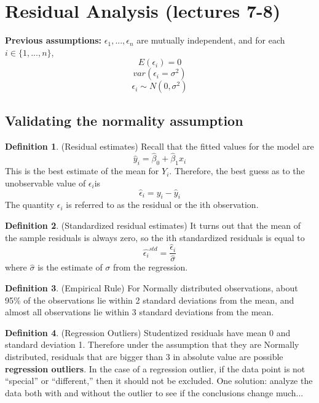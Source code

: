 \documentclass[12pt]{article}
\theoremstyle{definition}
\newtheorem{definition}{Definition}[section]
\theoremstyle{remark}
\begin{document}
\section{Residual Analysis (lectures 7-8)}
\textbf{Previous assumptions:}
\newline $\epsilon_1, ..., \epsilon_n$ are mutually independent, and for each $i \in \{1,..., n\}$, 
$$E(\epsilon_i) = 0$$
$$var(\epsilon_i = \sigma^2)$$
$$\epsilon_i \sim N(0, \sigma^2)$$
\subsection{Validating the normality assumption}
\begin{definition}(Residual estimates)
    Recall that the fitted values for the model are
    $$\hat{y}_i = \hat{\beta}_0 + \hat{\beta}_1 x_i$$
    This is the best estimate of the mean for $Y_i $. Therefore, the best guess as
    to the unobservable value of $\epsilon_i $is
    $$\hat{\epsilon}_i = y_i - \hat{y}_i$$
    The quantity $\epsilon_i$ is referred to as the residual or the ith observation.
\end{definition}

\begin{definition}(Standardized residual estimates)
    It turns out that the mean of the sample residuals is always zero, so the ith standardized residuals is equal to
    $$\hat{\epsilon_i}^{std} = \frac{\hat{\epsilon}_i}{\hat{\sigma}}$$
    where $\hat{\sigma}$ is the estimate of $\sigma$ from the regression.
\end{definition}
\begin{definition}(Empirical Rule)
    For Normally distributed observations, about 95\% of the observations lie within 2 standard deviations from the
    mean, and almost all observations lie within 3 standard deviations from the mean.
\end{definition}

\begin{definition}(Regression Outliers)
    Studentized residuals have mean 0 and standard deviation 1. 
    Therefore under the assumption that they are Normally distributed, 
    residuals that are bigger than 3 in absolute value are possible \textbf{regression outliers}.
    In the case of a regression outlier, if the data point is not “special” or “different,” 
    then it should not be excluded.
    \newline 
    One solution: analyze the data both with and without the outlier to see if the conclusions change much...
\end{definition}
\end{document}
